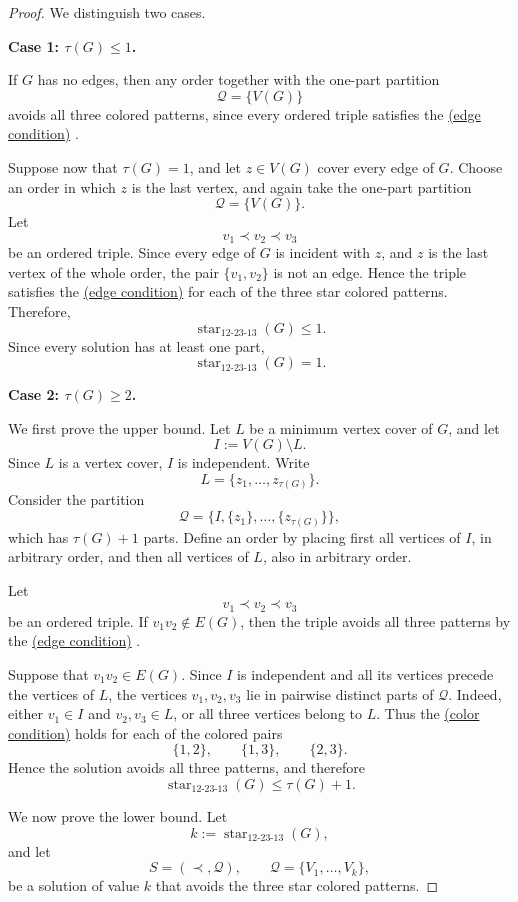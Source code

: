 \documentclass[12pt]{article}
\theoremstyle{plain}
\theoremstyle{definition}
\theoremstyle{remark}
\theoremstyle{definition}
\newcommand{\edgecondition}{%
  \hyperref[def:avoid:cond:edge]{(edge condition)}\xspace
}
\newcommand{\colorcondition}{%
  \hyperref[def:avoid:cond:color]{(color condition)}\xspace
}
\begin{document}
\begin{proof}
We distinguish two cases.

\medskip
\noindent\textbf{Case 1: \(\tau(G)\le 1\).}

If \(G\) has no edges, then any order together with the one-part partition
\[
\mathcal Q=\{V(G)\}
\]
avoids all three colored patterns, since every ordered triple satisfies the
\edgecondition.

Suppose now that \(\tau(G)=1\), and let \(z\in V(G)\) cover every edge of \(G\).
Choose an order in which \(z\) is the last vertex, and again take the one-part partition
\[
\mathcal Q=\{V(G)\}.
\]
Let
\[
v_1\prec v_2\prec v_3
\]
be an ordered triple. Since every edge of \(G\) is incident with \(z\), and \(z\) is the last vertex of the whole
order, the pair \(\{v_1,v_2\}\) is not an edge. Hence the triple satisfies the \edgecondition  for each of
the three star colored patterns.
Therefore,
\[
\operatorname{star}_{12\text{-}23\text{-}13}(G)\le 1.
\]
Since every solution has at least one part,
\[
\operatorname{star}_{12\text{-}23\text{-}13}(G)=1.
\]

\medskip
\noindent\textbf{Case 2: \(\tau(G)\ge 2\).}

We first prove the upper bound. Let \(L\) be a minimum vertex cover of \(G\), and let
\[
I:=V(G)\setminus L.
\]
Since \(L\) is a vertex cover, \(I\) is independent. Write
\[
L=\{z_1,\dots,z_{\tau(G)}\}.
\]
Consider the partition
\[
\mathcal Q
=
\bigl\{I,\{z_1\},\dots,\{z_{\tau(G)}\}\bigr\},
\]
which has \(\tau(G)+1\) parts. Define an order by placing first all vertices of \(I\), in arbitrary order, and then
all vertices of \(L\), also in arbitrary order.

Let
\[
v_1\prec v_2\prec v_3
\]
be an ordered triple. If \(v_1v_2\notin E(G)\), then the triple avoids all three patterns by the
\edgecondition.

Suppose that \(v_1v_2\in E(G)\). Since \(I\) is independent and all its vertices precede the vertices of \(L\),
the vertices \(v_1,v_2,v_3\) lie in pairwise distinct parts of \(\mathcal Q\). Indeed, either \(v_1\in I\) and
\(v_2,v_3\in L\), or all three vertices belong to \(L\).
Thus the \colorcondition holds for each of the colored pairs
\[
\{1,2\},\qquad \{1,3\},\qquad \{2,3\}.
\]
Hence the solution avoids all three patterns, and therefore
\[
\operatorname{star}_{12\text{-}23\text{-}13}(G)
\le \tau(G)+1.
\]

We now prove the lower bound. Let
\[
k:=\operatorname{star}_{12\text{-}23\text{-}13}(G),
\]
and let
\[
S=(\prec,\mathcal Q),
\qquad
\mathcal Q=\{V_1,\dots,V_k\},
\]
be a solution of value \(k\) that avoids the three star colored patterns.


\end{proof}
\end{document}
